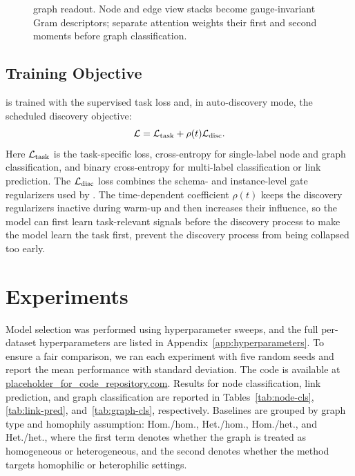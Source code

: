 \begin{figure}[t]
  \centering
  \fbox{\rule{0pt}{4.2cm}\rule{0.94\columnwidth}{0pt}}
  \caption{\sheafcovpool{} graph readout. Node and edge view stacks become
  gauge-invariant Gram descriptors; separate attention weights their first and second moments
  before graph classification.}
  \label{fig:sheafcovpool}
\end{figure}

\subsection{Training Objective}

\method{} is trained with the supervised task loss and, in auto-discovery mode, the scheduled
\ampss{} discovery objective:
\begin{equation}
  \mathcal{L}
  =\mathcal{L}_{\mathrm{task}}
   +\rho(t)\mathcal{L}_{\mathrm{disc}} .
  \label{eq:loss}
\end{equation}
Here \(\mathcal{L}_{\mathrm{task}}\) is the task-specific loss, cross-entropy for single-label node and graph classification, and
binary cross-entropy for multi-label classification or link prediction. The \(\mathcal{L}_{\mathrm{disc}}\) loss combines
the schema- and instance-level gate regularizers used by \ampss{}. The time-dependent coefficient \(\rho(t)\) keeps the discovery regularizers inactive during warm-up and then increases their influence, so the model can first learn task-relevant signals before the \ampss{} discovery process to make the model learn the task first, prevent the discovery process from being collapsed too early.



\section{Experiments}
\label{sec:experiments}


Model selection was performed using hyperparameter sweeps, and the full per-dataset hyperparameters are listed in Appendix~\ref{app:hyperparameters}. To ensure a fair comparison, we ran each experiment with five random seeds and report the mean performance with standard deviation. The code is available at \url{placeholder_for_code_repository.com}. Results for node classification, link prediction, and graph classification are reported in Tables~\ref{tab:node-cls}, \ref{tab:link-pred}, and~\ref{tab:graph-cls}, respectively. Baselines are grouped by graph type and homophily assumption: Hom./hom., Het./hom., Hom./het., and Het./het., where the first term denotes whether the graph is treated as homogeneous or heterogeneous, and the second denotes whether the method targets homophilic or heterophilic settings.

